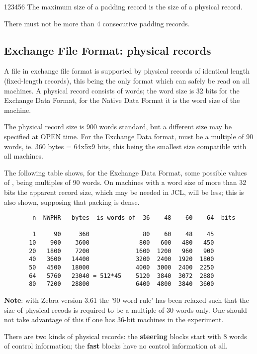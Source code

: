 \begin{DLtt}{123456}
The maximum size of a padding record is the size of a
physical record.

There must not be more than 4 consecutive padding records.

\subsection*{Exchange File Format: physical records}

A file in exchange file format is supported by physical records of
identical length (fixed-length records), this being the only
format which can safely be read on all machines.
A physical record consists of  words;
the word size is 32 bits for the Exchange Data Format,
for the Native Data Format it is the word size of the machine.

The physical record size  is 900 words standard,
but a different size may be specified at OPEN time.
For the Exchange Data format,  must be a multiple of 90 words,
ie. 360 bytes = 64x5x9 bits,
this being the smallest size compatible with all machines.

The following table shows, for the Exchange Data Format,
some possible values of , being multiples of 90 words.
On machines with a word size of more than 32 bits the apparent
record size, which may be needed in JCL, will be less;
this is also shown, supposing that packing is dense.

\begin{verbatim}
        n  NWPHR   bytes  is words of  36    48    60    64  bits

        1     90     360               80    60    48    45
       10    900    3600              800   600   480   450
       20   1800    7200             1600  1200   960   900
       40   3600   14400             3200  2400  1920  1800
       50   4500   18000             4000  3000  2400  2250
       64   5760   23040 = 512*45    5120  3840  3072  2880
       80   7200   28800             6400  4800  3840  3600
\end{verbatim}

{\bf Note}: with Zebra version 3.61
the '90 word rule' has been relaxed such that the size of
physical recods is required to be a multiple of 30 words only.
One should not take advantage of this if one has 36-bit machines
in the experiment.

There are two kinds of physical records:
the {\bf steering} blocks start with 8 words of control information;
the {\bf fast} blocks have no control information at all.


\end{DLtt}
